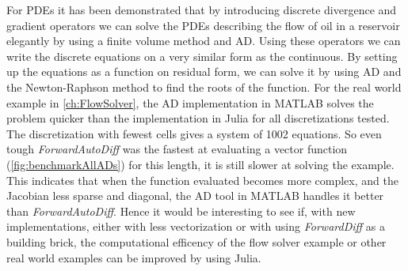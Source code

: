 For PDEs it has been demonstrated that by introducing discrete divergence and gradient operators we can solve the PDEs describing the flow of oil in a reservoir elegantly by using a finite volume method and AD. Using these operators we can write the discrete equations on a very similar form as the continuous. By setting up the equations as a function on residual form, we can solve it by using AD and the Newton-Raphson method to find the roots of the function. For the real world example in \autoref{ch:FlowSolver}, the AD implementation in MATLAB solves the problem quicker than the implementation in Julia for all discretizations tested. The discretization with fewest cells gives a system of 1002 equations. So even tough \textit{ForwardAutoDiff} was the fastest at evaluating a vector function (\autoref{fig:benchmarkAllADs}) for this length, it is still slower at solving the example. This indicates that when the function evaluated becomes more complex, and the Jacobian less sparse and diagonal, the AD tool in MATLAB handles it better than \textit{ForwardAutoDiff}. Hence it would be interesting to see if, with new implementations, either with less vectorization or with using \textit{ForwardDiff} as a building brick, the computational efficency of the flow solver example or other real world examples can be improved by using Julia.

